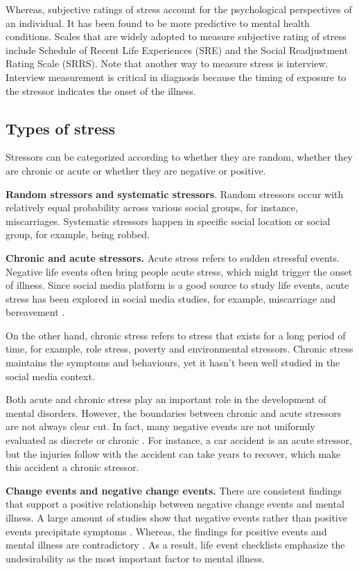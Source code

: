 Whereas, subjective ratings of stress account for the psychological perspectives of an individual. It has been found to be more predictive to mental health conditions. Scales that are widely adopted to measure subjective rating of stress include Schedule of Recent Life Experiences (SRE) \cite{nuckolls1972psychosocial} and the Social Readjustment Rating Scale (SRRS). Note that another way to measure stress is interview. Interview measurement is critical in diagnosis because the timing of exposure to the stressor indicates the onset of the illness.

\subsection{Types of stress}
Stressors can be categorized according to whether they are random, whether they are chronic or acute or whether they are negative or positive. 

\textbf{Random stressors and systematic stressors}. Random stressors occur with relatively equal probability across various social groups, for instance, miscarriages. Systematic stressors happen in specific social location or social group, for example, being robbed. 

\textbf{Chronic and acute stressors.}  Acute stress refers to sudden stressful events. Negative life events often bring people acute stress, which might trigger the onset of illness. Since social media platform is a good source to study life events, acute stress has been explored in social media studies, for example, miscarriage \cite{andalibi_announcing_2018} and bereavement \cite{brubaker2012grief}.

On the other hand, chronic stress refers to stress that exists for a long period of time, for example, role stress, poverty and environmental stressors. Chronic stress maintains the symptoms and behaviours, yet it hasn't been well studied in the social media context.

Both acute and chronic stress play an important role in the development of mental disorders. However, the boundaries between chronic and acute stressors are not always clear cut. In fact, many negative events are not uniformly evaluated as discrete or chronic \cite{avison1988stressful}. For instance, a car accident is an acute stressor, but the injuries follow with the accident can take years to recover, which make this accident a chronic stressor.

\textbf{Change events and negative change events.} There are consistent findings that support a positive relationship between negative change events and mental illness. A large amount of studies show that negative events rather than positive events precipitate symptoms \cite{rabkin1976life,turner1995epidemiology}. Whereas, the findings for positive events and mental illness are contradictory \cite{zautra1983life}. As a result, life event checklists emphasize the undesirability as the most important factor to mental illness. 

